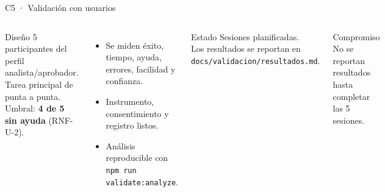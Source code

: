 \documentclass[aspectratio=169,10pt]{beamer}
\newcommand{\code}[1]{\texttt{\small #1}}
\begin{document}
\begin{frame}{C5 · Validación con usuarios}
  \begin{columns}[T,onlytextwidth]
      \begin{block}{Diseño}
        5 participantes del perfil analista/aprobador.\\
        Tarea principal de punta a punta.\\
        Umbral: \textbf{4 de 5 sin ayuda} (RNF-U-2).
      \end{block}
      \begin{itemize}
        \item Se miden éxito, tiempo, ayuda, errores, facilidad y confianza.
        \item Instrumento, consentimiento y registro listos.
        \item Análisis reproducible con \code{npm run validate:analyze}.
      \end{itemize}
      \begin{block}{Estado}
        Sesiones planificadas.\\[1mm]
        Los resultados se reportan en \code{docs/validacion/resultados.md}.
      \end{block}
      \begin{block}{Compromiso}
        No se reportan resultados hasta completar las 5 sesiones.
      \end{block}
  \end{columns}
\end{frame}
\end{document}
